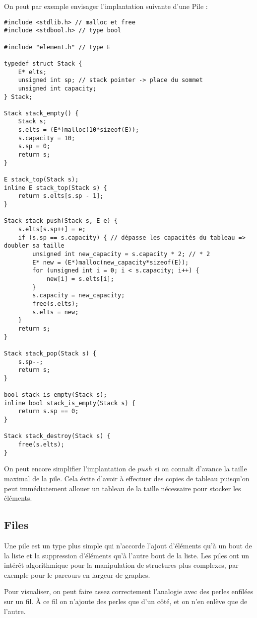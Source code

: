 \documentclass[../../../main.tex]{subfiles}
\begin{document}
On peut par exemple envisager l'implantation suivante d'une Pile :
\begin{verbatim}
#include <stdlib.h> // malloc et free
#include <stdbool.h> // type bool

#include "element.h" // type E

typedef struct Stack {
	E* elts;
	unsigned int sp; // stack pointer -> place du sommet
	unsigned int capacity;
} Stack;

Stack stack_empty() {
	Stack s;
	s.elts = (E*)malloc(10*sizeof(E));
	s.capacity = 10;
	s.sp = 0;
	return s;
}

E stack_top(Stack s);
inline E stack_top(Stack s) {
	return s.elts[s.sp - 1];
}

Stack stack_push(Stack s, E e) {
	s.elts[s.sp++] = e;
	if (s.sp == s.capacity) { // dépasse les capacités du tableau => doubler sa taille
		unsigned int new_capacity = s.capacity * 2; // * 2
		E* new = (E*)malloc(new_capacity*sizeof(E));
		for (unsigned int i = 0; i < s.capacity; i++) {
			new[i] = s.elts[i];
		}
		s.capacity = new_capacity;
		free(s.elts);
		s.elts = new;
	}
	return s;
}

Stack stack_pop(Stack s) {
	s.sp--;
	return s;
}

bool stack_is_empty(Stack s);
inline bool stack_is_empty(Stack s) {
	return s.sp == 0;
}

Stack stack_destroy(Stack s) {
	free(s.elts);
}
\end{verbatim}
On peut encore simplifier l'implantation de $push$ si on connaît d'avance la taille maximal de la pile. Cela évite d'avoir à effectuer des copies de tableau puisqu'on peut immédiatement allouer un tableau de la taille nécessaire pour stocker les éléments.
\subsection{Files}
Une pile est un type plus simple qui n'accorde l'ajout d'éléments qu'à un bout de la liste et la suppression d'éléments qu'à l'autre bout de la liste. Les piles ont un intérêt algorithmique pour la manipulation de structures plus complexes, par exemple pour le parcours en largeur de graphes.

Pour visualiser, on peut faire assez correctement l'analogie avec des perles enfilées sur un fil. À ce fil on n'ajoute des perles que d'un côté, et on n'en enlève que de l'autre.

\begin{minipage}{\textwidth}
	\begin{center}
		
	\end{center}
\end{minipage}
\end{document}
